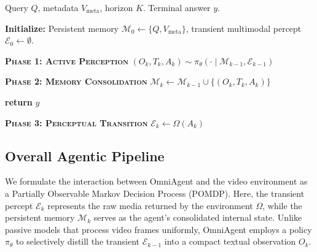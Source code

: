 \documentclass{article}
\theoremstyle{plain}
\theoremstyle{definition}
\theoremstyle{remark}
\begin{document}
\begin{algorithm}[t]
\caption{OmniAgent: Active Perception and Memory Consolidation}
\label{alg:omniagent}
\begin{algorithmic}[1]
\REQUIRE Query $Q$, metadata $V_{\text{meta}}$, horizon $K$.
\ENSURE Terminal answer $y$.

\vspace{0.1cm}
\STATE \textbf{Initialize:} Persistent memory $\mathcal{M}_0 \gets \{Q, V_{\text{meta}}\}$, transient multimodal percept $\mathcal{E}_0 \gets \emptyset$.
\vspace{0.1cm}

    \STATE \textbf{\textsc{Phase 1: Active Perception}}
    \STATE \quad $(O_k, T_k, A_k) \sim \pi_\theta(\cdot \mid \mathcal{M}_{k-1}, \mathcal{E}_{k-1})$
    \STATE {}   
    
    \vspace{0.1cm}
    \STATE \textbf{\textsc{Phase 2: Memory Consolidation}}
    \STATE \quad $\mathcal{M}_k \gets \mathcal{M}_{k-1} \cup \{(O_k, T_k, A_k)\}$
    \STATE {}

    \vspace{0.1cm}
        \STATE \textbf{return} $y$
    \ENDIF

    \vspace{0.1cm}
    \STATE \textbf{\textsc{Phase 3: Perceptual Transition}}
    \STATE \quad $\mathcal{E}_k \gets \Omega(A_k)$
    \STATE {}
\ENDFOR
\end{algorithmic}
\end{algorithm}
\vspace{-5mm}


\vspace{2mm}
\subsection{Overall Agentic Pipeline} 
\label{sec:overall}
We formulate the interaction between OmniAgent and the video environment as a Partially Observable Markov Decision Process (POMDP). Here, the transient percept $\mathcal{E}_k$ represents the raw media returned by the environment $\Omega$, while the persistent memory $\mathcal{M}_k$ serves as the agent's consolidated internal state. Unlike passive models that process video frames uniformly, OmniAgent employs a policy $\pi_\theta$ to selectively distill the transient $\mathcal{E}_{k-1}$ into a compact textual observation $O_k$.
\end{document}
